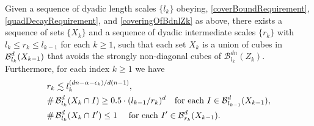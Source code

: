 \begin{lemma} 
	Given a sequence of dyadic length scales $\{l_k\}$ obeying, \eqref{coverBoundRequirement}, \eqref{quadDecayRequirement}, and \eqref{coveringOfBdnlZk} as above, there exists a sequence of sets $\{X_k\}$ and a sequence of dyadic intermediate scales $\{ r_k \}$ with $l_k \leq r_k \leq l_{k-1}$ for each $k \geq 1$, such that each set $X_k$ is a union of cubes in $\operatorname{\mathcal{B}}_{l_k}^d(X_{k-1})$ that avoids the strongly non-diagonal cubes of $\mathcal B_{l_k}^{dn}(Z_k)$. Furthermore, for each index $k\geq 1$ we have
	\begin{align}
		& r_k \lesssim l_k^{(dn-\alpha -\epsilon_k)/d(n-1)},\label{rkSizeBound}\\
		& \# \B^d_{l_k}(X_k \cap I) \geq 0.5 \cdot (l_{k-1}/r_k)^d \quad \text{for each}\ I\in \B_{l_{k-1}}^d(X_{k-1}), \label{manyIkInIkm1}\\
		&\# \B^d_{l_k}(X_k \cap I') \leq 1 \quad \text{ for each}\ I' \in \B_{r_{k}}^d(X_{k-1}).\label{XkWellDistributed}
	\end{align}
\end{lemma}

